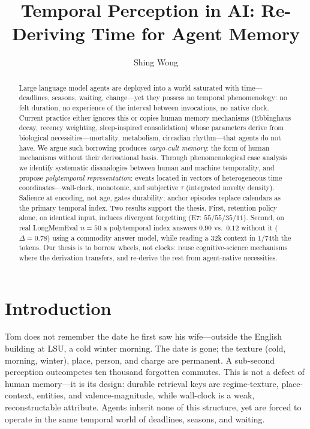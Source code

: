 \documentclass[letterpaper]{article}
\title{Temporal Perception in AI: Re-Deriving Time for Agent Memory}
\author{Shing Wong}
\begin{document}
\maketitle
\begin{abstract}
Large language model agents are deployed into a world saturated with time---deadlines, seasons, waiting, change---yet they possess no temporal phenomenology: no felt duration, no experience of the interval between invocations, no native clock. Current practice either ignores this or copies human memory mechanisms (Ebbinghaus decay, recency weighting, sleep-inspired consolidation) whose parameters derive from biological necessities---mortality, metabolism, circadian rhythm---that agents do not have. We argue such borrowing produces \emph{cargo-cult memory}: the form of human mechanisms without their derivational basis. Through phenomenological case analysis we identify systematic disanalogies between human and machine temporality, and propose \emph{polytemporal representation}: events located in vectors of heterogeneous time coordinates---wall-clock, monotonic, and subjective $\tau$ (integrated novelty density). Salience at encoding, not age, gates durability; anchor episodes replace calendars as the primary temporal index. Two results support the thesis. First, retention policy alone, on identical input, induces divergent forgetting (E7: $55/55/35/11$). Second, on real LongMemEval $n{=}50$ a polytemporal index answers $0.90$ vs.\ $0.12$ without it ($\Delta{=}0.78$) using a commodity answer model, while reading a $32$k context in $1/74$th the tokens. Our thesis is to borrow wheels, not clocks: reuse cognitive-science mechanisms where the derivation transfers, and re-derive the rest from agent-native necessities.
\end{abstract}

\section{Introduction}
Tom does not remember the date he first saw his wife---outside the English building at LSU, a cold winter morning. The date is gone; the texture (cold, morning, winter), place, person, and charge are permanent. A sub-second perception outcompetes ten thousand forgotten commutes. This is not a defect of human memory---it is its design: durable retrieval keys are regime-texture, place-context, entities, and valence-magnitude, while wall-clock is a weak, reconstructable attribute. Agents inherit none of this structure, yet are forced to operate in the same temporal world of deadlines, seasons, and waiting.
\end{document}
